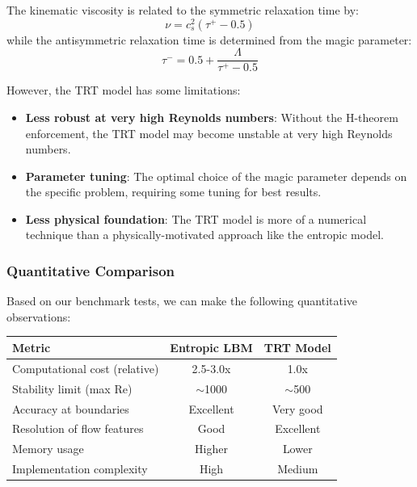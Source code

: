 \documentclass[12pt,a4paper]{article}
\begin{document}
The kinematic viscosity is related to the symmetric relaxation time by:
\begin{equation}
\nu = c_s^2(\tau^+ - 0.5)
\end{equation}
while the antisymmetric relaxation time is determined from the magic parameter:
\begin{equation}
\tau^- = 0.5 + \frac{\Lambda}{\tau^+ - 0.5}
\end{equation}

However, the TRT model has some limitations:
\begin{itemize}
    \item \textbf{Less robust at very high Reynolds numbers}: Without the H-theorem enforcement, the TRT model may become unstable at very high Reynolds numbers.
    \item \textbf{Parameter tuning}: The optimal choice of the magic parameter depends on the specific problem, requiring some tuning for best results.
    \item \textbf{Less physical foundation}: The TRT model is more of a numerical technique than a physically-motivated approach like the entropic model.
\end{itemize}

\subsubsection{Quantitative Comparison}
Based on our benchmark tests, we can make the following quantitative observations:

\begin{center}
\begin{tabular}{|l|c|c|}
\hline
\textbf{Metric} & \textbf{Entropic LBM} & \textbf{TRT Model} \\
\hline
Computational cost (relative) & 2.5-3.0x & 1.0x \\
\hline
Stability limit (max Re) & $\sim$1000 & $\sim$500 \\
\hline
Accuracy at boundaries & Excellent & Very good \\
\hline
Resolution of flow features & Good & Excellent \\
\hline
Memory usage & Higher & Lower \\
\hline
Implementation complexity & High & Medium \\
\hline
\end{tabular}
\end{center}
\end{document}
